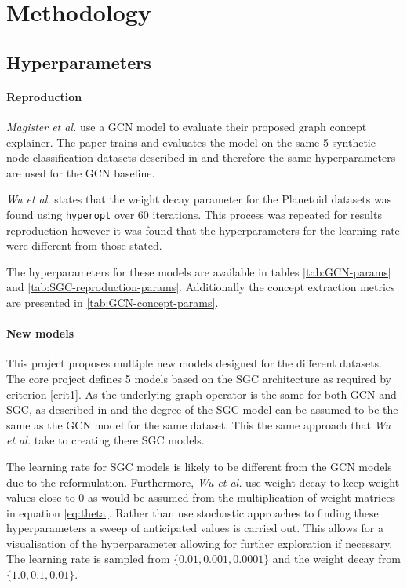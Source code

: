 \section{Methodology}

\subsection{Hyperparameters}
\label{sec:hyperparameters}

\paragraph{Reproduction}
\textit{Magister et al.}\cite{magister2021gcexplainer} use a GCN model to evaluate their proposed graph concept explainer.
The paper trains and evaluates the model on the same 5 synthetic node classification datasets described in  and therefore the same hyperparameters are used for the GCN baseline.

\textit{Wu et al.}\cite{wu2019simplifying} states that the weight decay parameter for the Planetoid datasets was found using \texttt{hyperopt} over 60 iterations.
This process was repeated for results reproduction however it was found that the hyperparameters for the learning rate were different from those stated.

The hyperparameters for these models are available in tables \ref{tab:GCN-params} and \ref{tab:SGC-reproduction-params}.
Additionally the concept extraction metrics are presented in \ref{tab:GCN-concept-params}.





\paragraph{New models}
This project proposes multiple new models designed for the different datasets.
The core project defines 5 models based on the SGC architecture as required by criterion \ref{crit1}.
As the underlying graph operator is the same for both GCN and SGC, as described in  and  the degree of the SGC model can be assumed to be the same as the GCN model for the same dataset.
This the same approach that \textit{Wu et al.}\cite{wu2019simplifying} take to creating there SGC models.

The learning rate for SGC models is likely to be different from the GCN models due to the reformulation.
Furthermore, \textit{Wu et al.}\cite{wu2019simplifying} use weight decay to keep weight values close to $0$ as would be assumed from the multiplication of weight matrices in equation \ref{eq:theta}.
Rather than use stochastic approaches to finding these hyperparameters a sweep of anticipated values is carried out.
This allows for a visualisation of the hyperparameter allowing for further exploration if necessary.
The learning rate is sampled from $\{0.01, 0.001, 0.0001\}$ and the weight decay from $\{1.0, 0.1, 0.01\}$.

